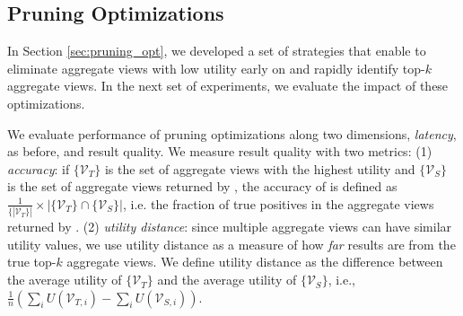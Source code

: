 
\subsection{Pruning Optimizations}
\label{sec:custom_execution_engine_expts}
In Section \ref{sec:pruning_opt}, we developed a set of strategies that enable \SeeDB to eliminate aggregate views with low utility early on and rapidly identify top-$k$ aggregate views.
In the next set of experiments, we evaluate 
the impact of these optimizations.

We evaluate performance of pruning optimizations along two dimensions, {\em latency}, as before, and
result quality.
We measure result quality with two metrics: 
(1) {\em accuracy}: if $\{\mathcal{V}_T\}$
is the set of aggregate views with the highest utility and $\{\mathcal{V}_S\}$ is the set of 
aggregate views returned by
\SeeDB, the accuracy of \SeeDB is defined as $\frac{1}{\{|\mathcal{V}_T\}|} \times 
|\{\mathcal{V}_T\} \cap \{\mathcal{V}_S\}|$, i.e. the
fraction of true positives in the aggregate views returned by \SeeDB. 
(2) {\em utility distance}: since multiple
aggregate views can have similar utility values, we use utility distance as a measure of how {\it far} \SeeDB 
results are from the true top-$k$ aggregate views. 
We define utility distance as the difference between the average utility of $\{\mathcal{V}_T\}$ 
and the average utility of $\{\mathcal{V}_S\}$, i.e., $\frac{1}{n}(\sum_{i}U(\mathcal{V}_{T,i}) - 
\sum_{i}U(\mathcal{V}_{S,i}))$.


